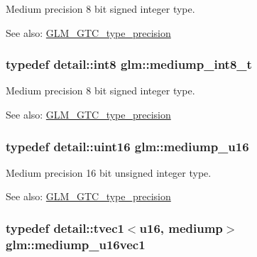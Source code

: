 Medium precision 8 bit signed integer type. \begin{Desc}
\item[See also:]\hyperlink{group__gtc__type__precision}{GLM\_\-GTC\_\-type\_\-precision} \end{Desc}
\hypertarget{group__gtc__type__precision_g626ac5f73d3538e62a879d6c56abfb36}{
\subsubsection[mediump\_\-int8\_\-t]{\setlength{\rightskip}{0pt plus 5cm}typedef detail::int8 {\bf glm::mediump\_\-int8\_\-t}}}
\label{group__gtc__type__precision_g626ac5f73d3538e62a879d6c56abfb36}


Medium precision 8 bit signed integer type. \begin{Desc}
\item[See also:]\hyperlink{group__gtc__type__precision}{GLM\_\-GTC\_\-type\_\-precision} \end{Desc}
\hypertarget{group__gtc__type__precision_g6745262ef6a6fdb8637b2387ef924828}{
\subsubsection[mediump\_\-u16]{\setlength{\rightskip}{0pt plus 5cm}typedef detail::uint16 {\bf glm::mediump\_\-u16}}}
\label{group__gtc__type__precision_g6745262ef6a6fdb8637b2387ef924828}


Medium precision 16 bit unsigned integer type. \begin{Desc}
\item[See also:]\hyperlink{group__gtc__type__precision}{GLM\_\-GTC\_\-type\_\-precision} \end{Desc}
\hypertarget{group__gtc__type__precision_gcb35d25d662b2a6396d094197ca834f0}{
\subsubsection[mediump\_\-u16vec1]{\setlength{\rightskip}{0pt plus 5cm}typedef detail::tvec1$<$u16, mediump$>$ {\bf glm::mediump\_\-u16vec1}}}
\label{group__gtc__type__precision_gcb35d25d662b2a6396d094197ca834f0}


